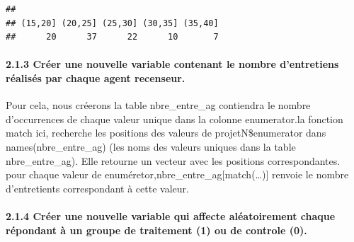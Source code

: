 \documentclass[
]{article}
\newenvironment{Shaded}{\begin{snugshade}}{\end{snugshade}}
\newcommand{\CommentTok}[1]{\textcolor[rgb]{0.56,0.35,0.01}{\textit{#1}}}
\newcommand{\FunctionTok}[1]{\textcolor[rgb]{0.13,0.29,0.53}{\textbf{#1}}}
\newcommand{\NormalTok}[1]{#1}
\newcommand{\OtherTok}[1]{\textcolor[rgb]{0.56,0.35,0.01}{#1}}
\newcommand{\SpecialCharTok}[1]{\textcolor[rgb]{0.81,0.36,0.00}{\textbf{#1}}}
\begin{document}
\begin{verbatim}
## 
## (15,20] (20,25] (25,30] (30,35] (35,40] 
##      20      37      22      10       7
\end{verbatim}

\hypertarget{cruxe9er-une-nouvelle-variable-contenant-le-nombre-dentretiens-ruxe9alisuxe9s-par-chaque-agent-recenseur.}{%
\paragraph{2.1.3 Créer une nouvelle variable contenant le nombre
d'entretiens réalisés par chaque agent
recenseur.}\label{cruxe9er-une-nouvelle-variable-contenant-le-nombre-dentretiens-ruxe9alisuxe9s-par-chaque-agent-recenseur.}}

Pour cela, nous créerons la table nbre\_entre\_ag contiendra le nombre
d'occurrences de chaque valeur unique dans la colonne enumerator.la
fonction match ici, recherche les positions des valeurs de
projetN\$enumerator dans names(nbre\_entre\_ag) (les noms des valeurs
uniques dans la table nbre\_entre\_ag). Elle retourne un vecteur avec
les positions correspondantes. pour chaque valeur de
enuméretor,nbre\_entre\_ag{[}match(\ldots){]} renvoie le nombre
d'entretients correspondant à cette valeur.

\begin{Shaded}
\end{Shaded}

\hypertarget{cruxe9er-une-nouvelle-variable-qui-affecte-aluxe9atoirement-chaque-ruxe9pondant-uxe0-un-groupe-de-traitement-1-ou-de-controle-0.}{%
\paragraph{2.1.4 Créer une nouvelle variable qui affecte aléatoirement
chaque répondant à un groupe de traitement (1) ou de controle
(0).}\label{cruxe9er-une-nouvelle-variable-qui-affecte-aluxe9atoirement-chaque-ruxe9pondant-uxe0-un-groupe-de-traitement-1-ou-de-controle-0.}}
\end{document}

